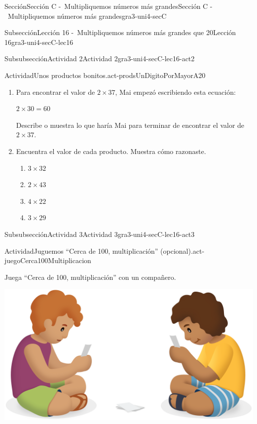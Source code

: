 \documentclass[twoside,10pt,]{article}
\begin{document}
\begin{sectionptx}{Sección}{Sección C -~Multipliquemos números más grandes}{}{Sección C -~Multipliquemos números más grandes}{}{}{gra3-uni4-secC}
\begin{subsectionptx}{Subsección}{Lección 16 -~Multipliquemos números más grandes que 20}{}{Lección 16}{}{}{gra3-uni4-secC-lec16}
\begin{subsubsectionptx}{Subsubsección}{Actividad 2}{}{Actividad 2}{}{}{gra3-uni4-secC-lec16-act2}
\begin{activity}{Actividad}{Unos productos bonitos.}{act-prodsUnDigitoPorMayorA20}
\begin{enumerate}
\item{}Para encontrar el valor de \(2\times 37\), Mai empezó escribiendo esta ecuación:%
\par
\(2 \times 30 = 60\)%
\par
Describe o muestra lo que haría Mai para terminar de encontrar el valor de \(2\times 37\).%
\item{}Encuentra el valor de cada producto. Muestra cómo razonaste.%
%
\begin{enumerate}
\item{}\(\displaystyle 3\times 32\)%
\item{}\(\displaystyle 2\times 43\)%
\item{}\(\displaystyle 4\times 22\)%
\item{}\(\displaystyle 3\times 29\)%
\end{enumerate}
\end{enumerate}
\end{activity}%
\end{subsubsectionptx}
%
%
\typeout{************************************************}
\typeout{************************************************}
%
\begin{subsubsectionptx}{Subsubsección}{Actividad 3}{}{Actividad 3}{}{}{gra3-uni4-secC-lec16-act3}
\begin{activity}{Actividad}{Juguemos “Cerca de 100, multiplicación” (opcional).}{act-juegoCerca100Multiplicacion}%
\begin{sidebyside}{2}{0.05}{0.05}{0.1}%
\begin{sbspanel}{0.5}%
Juega “Cerca de 100, multiplicación” con un compañero.%
\end{sbspanel}%
\begin{sbspanel}{0.3}%
\includegraphics[width=\linewidth]{external/png-source/CS 3.4 Lesson 16 Activity 2.png}
\end{sbspanel}%

\end{sidebyside}
\end{activity}
\end{subsubsectionptx}
\end{subsectionptx}
\end{sectionptx}
\end{document}
